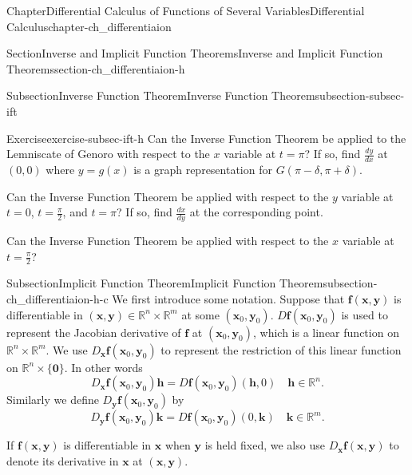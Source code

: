 \documentclass[oneside,10pt,]{book}
\numberwithin{equation}{section}
\newcommand{\bff}{\mathbf{f}}
\newcommand{\bh}{\mathbf{h}}
\newcommand{\bk}{\mathbf{k}}
\newcommand{\bx}{\mathbf{x}}
\newcommand{\by}{\mathbf{y}}
\newcommand{\bbR}{\mathbb{R}}
\begin{document}
\begin{chapterptx}{Chapter}{Differential Calculus of Functions of Several Variables}{}{Differential Calculus}{}{}{chapter-ch_differentiaion}
\begin{sectionptx}{Section}{Inverse and Implicit Function Theorems}{}{Inverse and Implicit Function Theorems}{}{}{section-ch_differentiaion-h}
\begin{subsectionptx}{Subsection}{Inverse Function Theorem}{}{Inverse Function Theorem}{}{}{subsection-subsec-ift}
\begin{inlineexercise}{Exercise}{}{exercise-subsec-ift-h}
Can the Inverse Function Theorem be applied  to the Lemniscate of Genoro with respect to the \(x\) variable at \(t=\pi\)? If so,   find \(\frac{dy}{dx}\) at \((0, 0)\) where \(y=g(x)\) is a graph representation for \(G(\pi -\delta, \pi+\delta)\).%
\par
Can the Inverse Function Theorem be applied with respect to the \(y\) variable at \(t=0\), \(t=\frac{\pi}{2}\), and \(t=\pi\)? If so, find \(\frac{dx}{dy}\) at the corresponding	 point.%
\par
Can the Inverse Function Theorem be applied with respect to the \(x\) variable at  \(t=\frac{\pi}{2}\)?%
\end{inlineexercise}%
\end{subsectionptx}
%
%
\typeout{************************************************}
\typeout{************************************************}
%
\begin{subsectionptx}{Subsection}{Implicit Function Theorem}{}{Implicit Function Theorem}{}{}{subsection-ch_differentiaion-h-c}
We first introduce some notation. Suppose that \({\mathbf f}({\mathbf x},{\mathbf y})\) is differentiable in \(({\mathbf x},{\mathbf y})\in \mathbb R^n \times \mathbb R^m\) at some \(({\mathbf x}_{0},{\mathbf y}_{0})\). \(D{\mathbf f}({\mathbf x}_{0},{\mathbf y}_{0})\) is used to represent the Jacobian derivative of \(\bff\) at \(({\mathbf x}_{0},{\mathbf y}_{0})\), which is a linear function on \(\mathbb R^n \times \mathbb R^m\). We use \(D_{\bx}{\mathbf f}({\mathbf x}_{0},{\mathbf y}_{0})\) to represent the restriction of this linear function on \(\mathbb R^n \times \{\mathbf 0\}\).  In other words%
\begin{equation*}
D_{\bx}{\mathbf f}({\mathbf x}_{0},{\mathbf y}_{0})\bh=D{\mathbf f}({\mathbf x}_{0},{\mathbf y}_{0})(\bh, 0)
\quad \bh \in \bbR^{n}\text{.}
\end{equation*}
Similarly we define \(D_{\by}{\mathbf f}({\mathbf x}_{0},{\mathbf y}_{0})\) by%
\begin{equation*}
D_{\by}{\mathbf f}({\mathbf x}_{0},{\mathbf y}_{0})\bk=D{\mathbf f}({\mathbf x}_{0},{\mathbf y}_{0})(0, \bk)
\quad \bk\in \bbR^{m}\text{.}
\end{equation*}
%
\par
If \({\mathbf f}({\mathbf x},{\mathbf y})\) is differentiable in \(\bx\) when \(\by\) is held fixed, we also use \(D_{\bx}{\mathbf f}({\mathbf x},{\mathbf y})\) to denote its derivative in \(\bx\) at \(({\mathbf x},{\mathbf y})\).%
\par

\end{subsectionptx}
\end{sectionptx}
\end{chapterptx}
\end{document}
